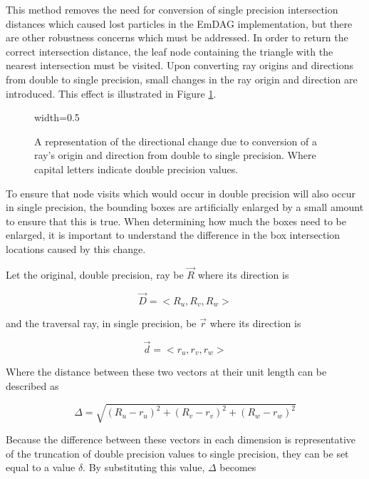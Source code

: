 This method removes the need for conversion of single precision intersection
distances which caused lost particles in the EmDAG implementation, but there are
other robustness concerns which must be addressed. In order to return the
correct intersection distance, the leaf node containing the triangle with the
nearest intersection must be visited. Upon converting ray origins and directions
from double to single precision, small changes in the ray origin and direction
are introduced. This effect is illustrated in Figure
\ref{fig:double_to_single_ray}.

\begin{figure}[H]
  \centering
  {width=0.5\textwidth}
  \caption[Reduced precision directional alterations.]{A representation of the
    directional change due to conversion of a ray's origin and direction from
    double to single precision. Where capital letters indicate double precision
    values.}
  \label{fig:double_to_single_ray}
\end{figure}

To ensure that node visits which would occur in double precision will also occur
in single precision, the bounding boxes are artificially enlarged by a small
amount to ensure that this is true. When determining how much the boxes need to
be enlarged, it is important to understand the difference in the box intersection
locations caused by this change.

Let the original, double precision, ray be $\vec{R}$ where its direction is

\begin{equation}
  \vec{D} = < R_{u}, R_{v}, R_{w} >
\end{equation}


and the traversal ray, in single precision, be $\vec{r}$ where its direction is

\begin{equation}
  \vec{d} = < r_{u}, r_{v}, r_{w} >
\end{equation}


Where the distance between these two vectors at their unit length
can be described as

\begin{equation}
  \Delta = \sqrt{ (R_{u} - r_{u})^{2} + (R_{v} - r_{v})^{2} + (R_{w} -
    r_{w})^{2} }
\end{equation}

Because the difference between these vectors in each dimension is representative
of the truncation of double precision values to single precision, they can be
set equal to a value $\delta$. By substituting this value, $\Delta$ becomes

